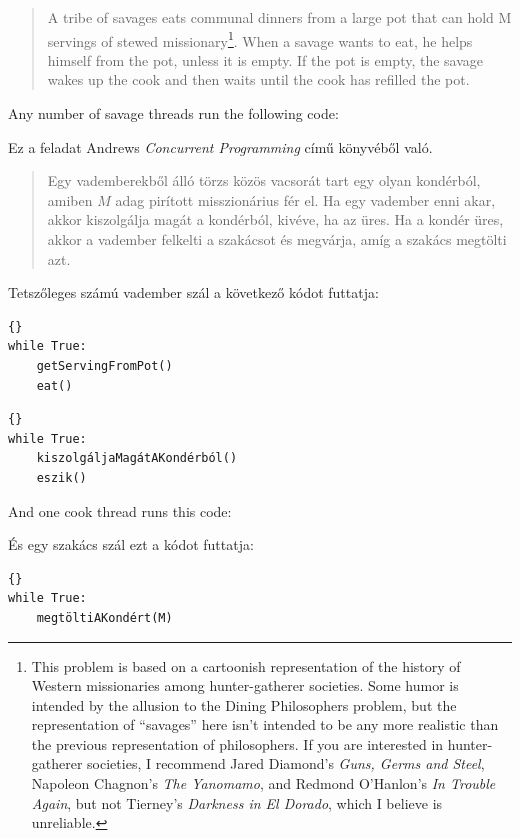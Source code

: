 \documentclass{book}
\begin{document}
\begin {quotation}
A tribe of savages eats communal dinners from a large pot that can
hold M servings of stewed missionary\footnote{This problem is based on
a cartoonish representation of the history of Western missionaries
among hunter-gatherer societies.  Some humor is intended by the
allusion to the Dining Philosophers problem, but the representation of
``savages'' here isn't intended to be any more realistic than the
previous representation of philosophers.  If you are interested in
hunter-gatherer societies, I recommend Jared Diamond's {\em Guns,
Germs and Steel}, Napoleon Chagnon's {\em The Yanomamo}, and Redmond
O'Hanlon's {\em In Trouble Again}, but not Tierney's {\em Darkness in
El Dorado}, which I believe is unreliable.}.  When a savage wants to
eat, he helps himself from the pot, unless it is empty.  If the pot is
empty, the savage wakes up the cook and then waits until the cook has
refilled the pot.
\end{quotation}

Any number of savage threads run the following code:

Ez a feladat Andrews {\em Concurrent Programming} \cite{andrews}
című könyvéből való.

\begin {quotation}
Egy vademberekből álló törzs közös vacsorát tart egy olyan kondérból,
amiben $M$ adag pirított misszionárius fér el. Ha egy vadember enni akar,
akkor kiszolgálja magát a kondérból, kivéve, ha az üres. Ha a kondér üres,
akkor a vadember felkelti a szakácsot és megvárja, amíg a szakács
megtölti azt.
\end{quotation}

Tetszőleges számú vadember szál a következő kódot futtatja:

\begin{lstlisting}[title={Unsynchronized savage code}]{}
while True:
    getServingFromPot()
    eat()
\end{lstlisting}

\begin{lstlisting}[title={Szinkronizálatlan vadember kód}]{}
while True:
    kiszolgáljaMagátAKondérból()
    eszik()
\end{lstlisting}

And one cook thread runs this code:

És egy szakács szál ezt a kódot futtatja:

\begin{lstlisting}[title={Szinkronizálatlan szakács kód}]{}
while True:
    megtöltiAKondért(M)
\end{lstlisting}
\end{document}
